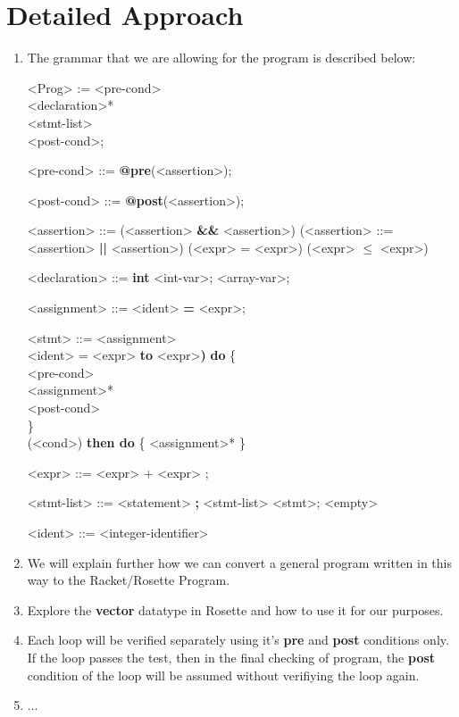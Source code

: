 \documentclass[letterpaper]{article} %
\begin{document}
\section {Detailed Approach}
\setlength{\grammarparsep}{20pt plus 1pt minus 1pt} %
\setlength{\grammarindent}{12em} %

\begin{enumerate}
	\item The grammar that we are allowing for the program is described below:
	\begin{grammar}
		<Prog> := <pre-cond>\\
						<declaration>*\\
						<stmt-list>\\
						<post-cond>;
		
		<pre-cond> ::= {\bf @pre}(<assertion>);
		
		<post-cond> ::= {\bf @post}(<assertion>);
		
		<assertion> ::= (<assertion> {\bf \&\&} <assertion>)
								\alt (<assertion> ::= <assertion> {\bf || }<assertion>)
								\alt (<expr> = <expr>)
								\alt (<expr>  $\le$  <expr>)
								
								
		
		<declaration>  ::= {\bf int} <int-var>;
								 <array-var>;
		
		<assignment>  ::= <ident> {\bf =} <expr>;		
					
		<stmt> ::= <assignment>\\
		<ident> = <expr> {\bf to} <expr>{\bf )} {\bf do} 
		\{\\
		<pre-cond>\\
		<assignment>*\\
		<post-cond>\\
		\}\\
		 (<cond>) {\bf then do}
	    \{
	    <assignment>*
	    \}
	    
	    <expr> ::=  <expr> + <expr>
    					\alt <array-var>[<expr>];
    					\alt <int-var>
    					
		<stmt-list> ::= <statement> {\bf ;} <stmt-list> 
						\alt <stmt>;
						\alt <empty>
		
		<ident>   ::= <integer-identifier>
		\\
	\end{grammar}

	\item We will explain further how we can convert a general program written in this way to the Racket/Rosette Program. 
	
	\item Explore the {\bf vector} datatype in Rosette and how to use it for our purposes. 
	
	\item Each loop will be verified separately using it's {\bf pre} and {\bf post} conditions only. If the loop passes the test, then in the final checking of program, the {\bf post} condition of the loop will be assumed without verifiying the loop again. 
	
	\item ...
\end{enumerate}
\end{document}
